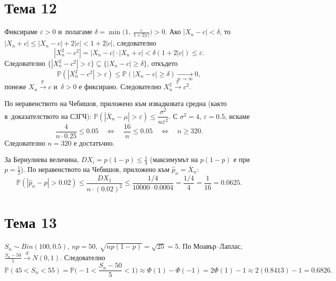 \section*{Тема 12}

\begin{proofbox}
Фиксираме $\varepsilon>0$ и~полагаме $\delta=\min\big(1,\
\tfrac\varepsilon{1+2|c|}\big)>0$. Ако $|X_n-c|<\delta$, то $|X_n+c|
\le|X_n-c|+2|c| < 1+2|c|$, следователно
\[
  |X_n^2-c^2| = |X_n-c|\cdot|X_n+c| < \delta(1+2|c|) \le
  \varepsilon.
\]
Следователно $\{|X_n^2-c^2|>\varepsilon\}\subseteq\{|X_n-c|\ge
\delta\}$, откъдето
\[
  \mathbb P(|X_n^2-c^2|>\varepsilon) \le \mathbb P(|X_n-c|\ge\delta)
  \xrightarrow[n\to\infty]{}0,
\]
понеже $X_n\xrightarrow{\mathbb P}c$ и~$\delta>0$ е фиксирано.
Следователно $X_n^2\xrightarrow{\mathbb P}c^2$. \qedbg
\end{proofbox}

\begin{proofbox}
По неравенството на Чебишов, приложено към извадковата средна (както
в~доказателството на СЗГЧ): $\mathbb P(|\overline X_n-\mu|>\varepsilon)
\le \dfrac{\sigma^2}{n\varepsilon^2}$. С $\sigma^2=4$, $\varepsilon=
0.5$, искаме
\[
  \frac{4}{n\cdot0.25} \le 0.05 \quad\Longleftrightarrow\quad
  \frac{16}n\le0.05 \quad\Longleftrightarrow\quad n\ge320.
\]
Следователно $n=320$ е достатъчно.
\end{proofbox}

\begin{proofbox}
За Бернулиева величина, $DX_i=p(1-p)\le\tfrac14$ (максимумът на
$p(1-p)$ е при $p=\tfrac12$). По неравенството на Чебишов, приложено
към $\hat p_n=\overline X_n$:
\[
  \mathbb P(|\hat p_n-p|>0.02) \le \frac{DX_1}{n\cdot(0.02)^2} \le
  \frac{1/4}{10000\cdot0.0004} = \frac{1/4}{4} = \frac1{16} =
  0.0625.
\]
\end{proofbox}

\section*{Тема 13}

\begin{proofbox}
$S_n\sim Bin(100,0.5)$, $np=50$, $\sqrt{np(1-p)}=\sqrt{25}=5$. По
Моавър--Лаплас, $\tfrac{S_n-50}5\xrightarrow d N(0,1)$. Следователно
\[
  \mathbb P(45<S_n<55) = \mathbb P\Big(-1<\frac{S_n-50}5<1\Big)
  \approx \Phi(1)-\Phi(-1) = 2\Phi(1)-1 \approx 2(0.8413)-1 =
  0.6826.
\]
\end{proofbox}

